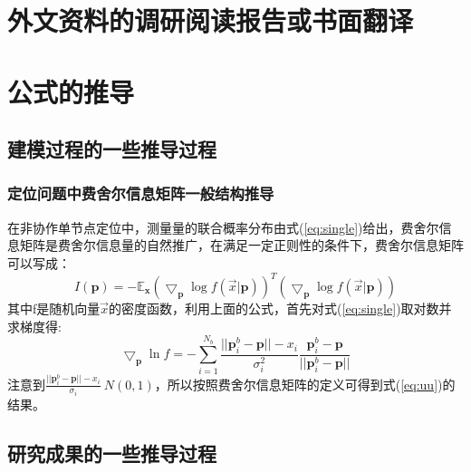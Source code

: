 \chapter{外文资料的调研阅读报告或书面翻译}

\chapter{公式的推导}
\section{建模过程的一些推导过程}
\subsection{定位问题中费舍尔信息矩阵一般结构推导}\label{A_F_1}
在非协作单节点定位中，测量量的联合概率分布由式(\ref{eq:single})给出，费舍尔信息矩阵是费舍尔信息量的自然推广，在满足一定正则性的条件下，费舍尔信息矩阵可以写成：
\begin{equation}
I(\bm{p})=-\mathbb{E}_{\bm{x}}(\bigtriangledown_{\bm{p}} \log f(\vec{x}|\bm{p}))^T(\bigtriangledown_{\bm{p}} \log f(\vec{x}|\bm{p}))
\end{equation}
其中f是随机向量$\vec{x}$的密度函数，利用上面的公式，首先对式(\ref{eq:single})取对数并求梯度得:
\begin{equation}
\bigtriangledown_{\bm{p}}\ln f=-\sum_{i=1}^{N_b}\frac{||\bm{p}_i^b-\bm{p}||-x_i}{\sigma_i^2}\frac{\bm{p}^b_i-\bm{p}}{||\bm{p}^b_i-\bm{p}||}
\end{equation}
注意到$\frac{||\bm{p}_i^b-\bm{p}||-x_i}{\sigma_i}~ N(0,1)$，所以按照费舍尔信息矩阵的定义可得到式(\ref{eq:uu})的结果。
\section{研究成果的一些推导过程}
